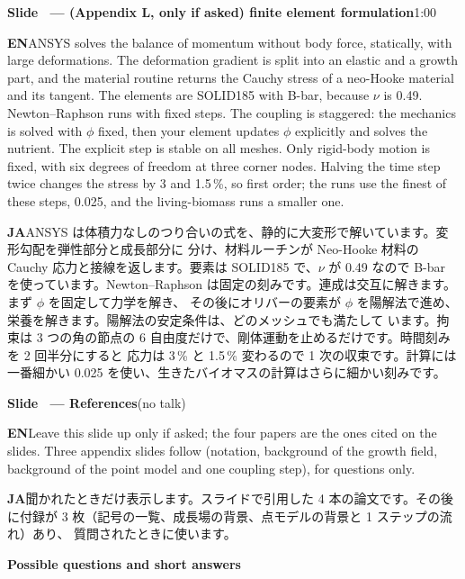 \documentclass[11pt,a4paper]{article}
\newcounter{sl}
\newcommand{\slide}[2]{\stepcounter{sl}\vspace{8pt}%
  {\color{c3}\large\bfseries Slide \thesl\ --- #1}\hfill{\small #2}\par\vspace{2pt}}
\newcommand{\EN}{\textbf{EN}\quad}
\newcommand{\JA}{\par\textbf{JA}\quad}
\begin{document}
\slide{(Appendix L, only if asked) finite element formulation}{1:00}
\EN ANSYS solves the balance of momentum without body force, statically,
with large deformations. The deformation gradient is split into an elastic
and a growth part, and the material routine returns the Cauchy stress of a
neo-Hooke material and its tangent. The elements are SOLID185 with B-bar,
because $\nu$ is 0.49. Newton--Raphson runs with fixed steps. The coupling is
staggered: the mechanics is solved with $\phi$ fixed, then your element
updates $\phi$ explicitly and solves the nutrient. The explicit step is stable
on all meshes. Only rigid-body motion is fixed, with six degrees of freedom
at three corner nodes. Halving the time step twice changes the stress by
3 and 1.5\,\%, so first order; the runs use the finest of these steps,
0.025, and the living-biomass runs a smaller one.
\JA ANSYS は体積力なしのつり合いの式を、静的に大変形で解いています。変形勾配を弾性部分と成長部分に
分け、材料ルーチンが Neo-Hooke 材料の Cauchy 応力と接線を返します。要素は SOLID185 で、$\nu$ が 0.49 なので
B-bar を使っています。Newton--Raphson は固定の刻みです。連成は交互に解きます。まず $\phi$ を固定して力学を解き、
その後にオリバーの要素が $\phi$ を陽解法で進め、栄養を解きます。陽解法の安定条件は、どのメッシュでも満たして
います。拘束は 3 つの角の節点の 6 自由度だけで、剛体運動を止めるだけです。時間刻みを 2 回半分にすると
応力は 3\,\% と 1.5\,\% 変わるので 1 次の収束です。計算には一番細かい 0.025 を使い、生きたバイオマスの計算はさらに細かい刻みです。

\slide{References}{(no talk)}
\EN Leave this slide up only if asked; the four papers are the ones cited on
the slides. Three appendix slides follow (notation, background of the growth
field, background of the point model and one coupling step), for questions only.
\JA 聞かれたときだけ表示します。スライドで引用した 4 本の論文です。その後に付録が
3 枚（記号の一覧、成長場の背景、点モデルの背景と 1 ステップの流れ）あり、
質問されたときに使います。

\vspace{12pt}
{\color{c3}\large\bfseries Possible questions and short answers}
\end{document}
